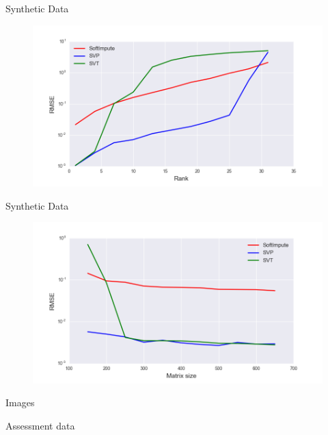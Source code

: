 \documentclass{beamer}
\begin{document}
\begin{frame}{Synthetic Data}
	\begin{figure}[h]
		\centering
		\includegraphics[width=1\linewidth]{./../results/synthetic/exper_2/synthetic_rank_rmse.png}
		\label{heat_map}
	\end{figure}
\end{frame}
\begin{frame}{Synthetic Data}
	\begin{figure}[h]
		\centering
		\includegraphics[width=1\linewidth]{./../results/synthetic/exper_3/synthetic_size_rmse.png}
		\label{heat_map}
	\end{figure}
\end{frame}
\begin{frame}{Images}
\end{frame}
\begin{frame}{Assessment data}
	
\end{frame}
\end{document}
